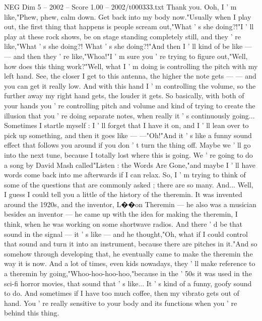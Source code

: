 \begin{textsample}{NEG Dim 5 – 2002 – Score 1.00 – 2002/t000333.txt}  \label{ex:f5_neg_078}
Thank you.
Ooh, I ' m like,"Phew, phew, calm down.
Get back into my body now."Usually when I play out, the first thing that happens is people scream out,"What ' s she doing?!"I ' ll play at these rock shows, be on stage standing completely still, and they ' re like,"What ' s she doing?!
What ' s she doing?!"And then I ' ll kind of be like — — and then they ' re like,"Whoa!"I ' m sure you ' re trying to figure out,"Well, how does this thing work?"Well, what I ' m doing is controlling the pitch with my left hand.
See, the closer I get to this antenna, the higher the note gets — — and you can get it really low.
And with this hand I ' m controlling the volume, so the further away my right hand gets, the louder it gets.
So basically, with both of your hands you ' re controlling pitch and volume and kind of trying to create the illusion that you ' re doing separate notes, when really it ' s continuously going...
Sometimes I startle myself : I ' ll forget that I have it on, and I ' ll lean over to pick up something, and then it goes like — —"Oh!"And it ' s like a funny sound effect that follows you around if you don ' t turn the thing off.
Maybe we ' ll go into the next tune, because I totally lost where this is going.
We ' re going to do a song by David Mash called"Listen : the Words Are Gone,"and maybe I ' ll have words come back into me afterwards if I can relax.
So, I ' m trying to think of some of the questions that are commonly asked ; there are so many.
And...
Well, I guess I could tell you a little of the history of the theremin.
It was invented around the 1920s, and the inventor, L{\EmojiFont �}{\EmojiFont �}on Theremin — he also was a musician besides an inventor — he came up with the idea for making the theremin, I think, when he was working on some shortwave radios.
And there ' d be that sound in the signal — it ' s like — and he thought,"Oh, what if I could control that sound and turn it into an instrument, because there are pitches in it."And so somehow through developing that, he eventually came to make the theremin the way it is now.
And a lot of times, even kids nowadays, they ' ll make reference to a theremin by going,"Whoo-hoo-hoo-hoo,"because in the ' 50s it was used in the sci-fi horror movies, that sound that ' s like...
It ' s kind of a funny, goofy sound to do.
And sometimes if I have too much coffee, then my vibrato gets out of hand.
You ' re really sensitive to your body and its functions when you ' re behind this thing.

\end{textsample}
